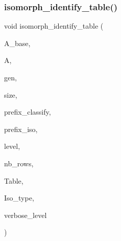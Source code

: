 \subsubsection{\texorpdfstring{isomorph\+\_\+identify\+\_\+table()}{isomorph\_identify\_table()}}
{\footnotesize\ttfamily void isomorph\+\_\+identify\+\_\+table (\begin{DoxyParamCaption}\item[{\mbox{\hyperlink{classaction}{action}} $\ast$}]{A\+\_\+base,  }\item[{\mbox{\hyperlink{classaction}{action}} $\ast$}]{A,  }\item[{\mbox{\hyperlink{classgenerator}{generator}} $\ast$}]{gen,  }\item[{\mbox{\hyperlink{galois_8h_a09fddde158a3a20bd2dcadb609de11dc}{I\+NT}}}]{size,  }\item[{const \mbox{\hyperlink{galois_8h_ab6cc7b4aeb6ea31aba2b3fbfc83ff5e6}{B\+Y\+TE}} $\ast$}]{prefix\+\_\+classify,  }\item[{const \mbox{\hyperlink{galois_8h_ab6cc7b4aeb6ea31aba2b3fbfc83ff5e6}{B\+Y\+TE}} $\ast$}]{prefix\+\_\+iso,  }\item[{\mbox{\hyperlink{galois_8h_a09fddde158a3a20bd2dcadb609de11dc}{I\+NT}}}]{level,  }\item[{\mbox{\hyperlink{galois_8h_a09fddde158a3a20bd2dcadb609de11dc}{I\+NT}}}]{nb\+\_\+rows,  }\item[{\mbox{\hyperlink{galois_8h_a09fddde158a3a20bd2dcadb609de11dc}{I\+NT}} $\ast$}]{Table,  }\item[{\mbox{\hyperlink{galois_8h_a09fddde158a3a20bd2dcadb609de11dc}{I\+NT}} $\ast$}]{Iso\+\_\+type,  }\item[{\mbox{\hyperlink{galois_8h_a09fddde158a3a20bd2dcadb609de11dc}{I\+NT}}}]{verbose\+\_\+level }\end{DoxyParamCaption})}

\mbox{\label{isomorph__global_8_c_a490bbe6199dc1e29d186b26834266e03}} 
